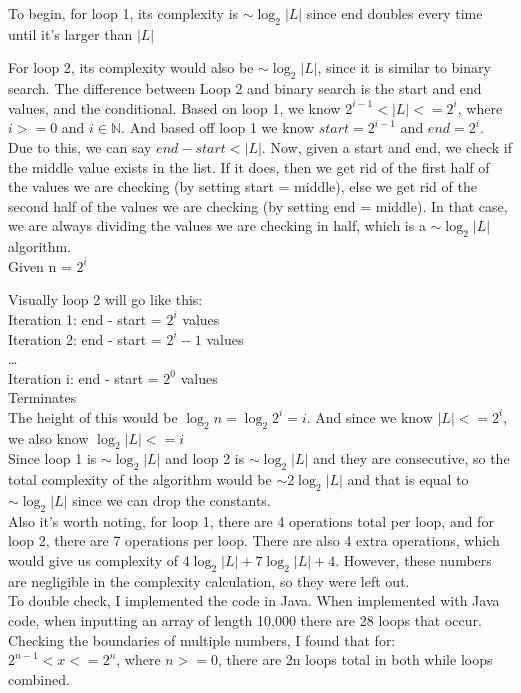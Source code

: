 \documentclass{article}
\begin{document}
To begin, for loop 1, its complexity is $\sim\log_2 |L|$ since end doubles every time until it's larger than $|L|$

For loop 2, its complexity would also be $\sim\log_2 |L|$, since it is similar to binary search. The difference between Loop 2 and binary search is the start and end values, and the conditional.
Based on loop 1, we know $2^{i-1} < |L| <= 2^{i}$, where $i >= 0$ and $i \in \mathbb{N}$. And based off loop 1 we know $start = 2^{i-1}$ and $end = 2^{i}$. Due to this, we can say $end - start < |L|$.
Now, given a start and end, we check if the middle value exists in the list. If it does, then we get rid of the first half of the values we are checking (by setting start = middle), else we get rid of the second half of the values we are checking (by setting end = middle).
In that case, we are always dividing the values we are checking in half, which is a $\sim\log_2 |L|$ algorithm.\\

Given n = $2^i$

Visually loop 2 will go like this:\\
Iteration 1: end - start = $2^i$ values\\
Iteration 2: end - start = $2^i-1$ values\\
\dots\\
Iteration i: end - start = $2^0$ values\\
\indent Terminates\\

The height of this would be $\log_2 n = \log_2 2^i = i$. And since we know $|L| <= 2^{i}$, we also know $\log_2|L| <= i$\\

Since loop 1 is $\sim\log_2 |L|$ and loop 2 is $\sim\log_2 |L|$ and they are consecutive, so the total complexity of the algorithm would be $\sim 2\log_2 |L|$ and that is equal to $\sim\log_2 |L|$ since we can drop the constants.\\
\indent Also it's worth noting, for loop 1, there are 4 operations total per loop, and for loop 2, there are 7 operations per loop. There are also 4 extra operations, which would give us complexity of $4\log_2 |L| + 7\log_2 |L| + 4$. However, these numbers are negligible in the complexity calculation, so they were left out.\\
\indent To double check, I implemented the code in Java. When implemented with Java code, when inputting an array of length 10,000 there are 28 loops that occur.
Checking the boundaries of multiple numbers, I found that for:\\
$2^{n-1} < x <= 2^{n}$, where $n >= 0$, there are 2n loops total in both while loops combined.\\
\end{document}
